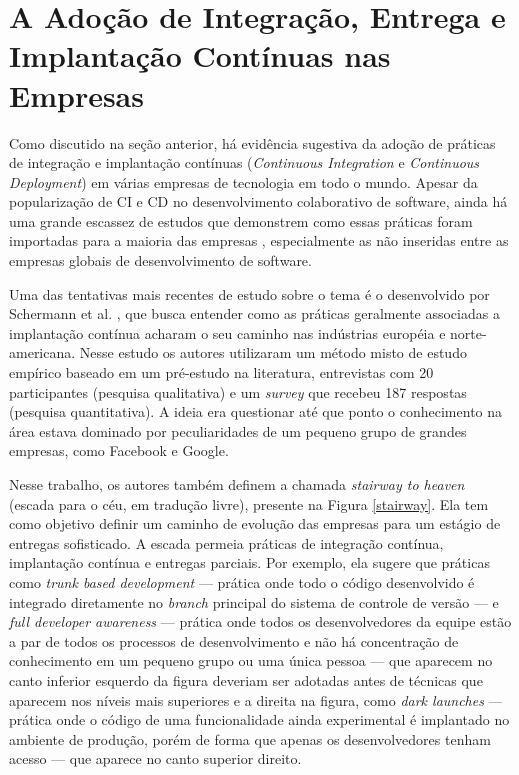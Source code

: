 \section{A Adoção de Integração, Entrega e Implantação Contínuas nas Empresas}

Como discutido na seção anterior, há evidência sugestiva da adoção de práticas de integração e implantação contínuas (\emph{Continuous Integration} e \emph{Continuous Deployment}) em várias empresas de tecnologia em todo o mundo. Apesar da popularização de CI e CD no desenvolvimento colaborativo de software, ainda há uma grande escassez de estudos que demonstrem como essas práticas foram importadas para a maioria das empresas \cite{empiricalStudy2016}, especialmente as não inseridas entre as empresas globais de desenvolvimento de software.

Uma das tentativas mais recentes de estudo sobre o tema é o desenvolvido por Schermann et al. \cite{empiricalStudy2016}, que busca entender como as práticas geralmente associadas a implantação contínua acharam o seu caminho nas indústrias européia e norte-americana. Nesse estudo os autores utilizaram um método misto de estudo empírico baseado em um pré-estudo na literatura, entrevistas com 20 participantes (pesquisa qualitativa) e um \emph{survey} que recebeu 187 respostas (pesquisa quantitativa). A ideia era questionar até que ponto o conhecimento na área estava dominado por peculiaridades de um pequeno grupo de grandes empresas, como Facebook e Google.

Nesse trabalho, os autores também definem a chamada \emph{stairway to heaven} (escada para o céu, em tradução livre), presente na Figura \ref{stairway}. Ela tem como objetivo definir um caminho de evolução das empresas para um estágio de entregas sofisticado. A escada permeia práticas de integração contínua, implantação contínua e entregas parciais.
Por exemplo, ela sugere que práticas como \emph{trunk based development} --- prática onde todo o código desenvolvido é integrado diretamente no \emph{branch} principal do sistema de controle de versão --- e \emph{full developer awareness} --- prática onde todos os desenvolvedores da equipe estão a par de todos os processos de desenvolvimento e não há concentração de conhecimento em um pequeno grupo ou uma única pessoa --- que aparecem no canto inferior esquerdo da figura deveriam ser adotadas antes de técnicas que aparecem nos níveis mais superiores e a direita na figura, como \emph{dark launches} --- prática onde o código de uma funcionalidade ainda experimental é implantado no ambiente de produção, porém de forma que apenas os desenvolvedores tenham acesso --- que aparece no canto superior direito.

